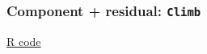 \documentclass[handout]{beamer}
\begin{document}


   \begin{frame}
   \frametitle{Component + residual: {\tt Climb}}
   \begin{center}
   \end{center}
   \href{http://stats191.stanford.edu/diagnostics.html#component-residual-plots}{R code}
   \end{frame}


   \begin{frame} 

   \end{frame}

   
\end{document}
